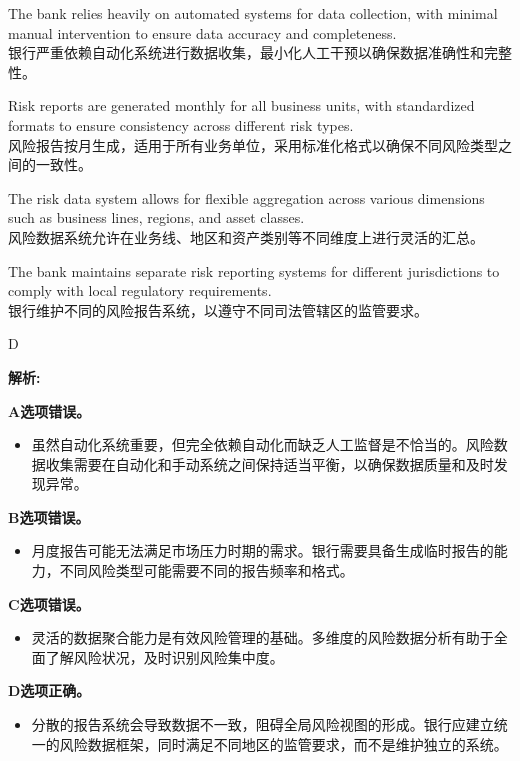 \documentclass{article}
\newenvironment{explanation}
{\textbf{解析:}\par}
{\par}
\begin{document}
\begin{choices}
    \item The bank relies heavily on automated systems for data collection, with minimal manual intervention to ensure data accuracy and completeness. \\
    银行严重依赖自动化系统进行数据收集，最小化人工干预以确保数据准确性和完整性。

    \item Risk reports are generated monthly for all business units, with standardized formats to ensure consistency across different risk types. \\
    风险报告按月生成，适用于所有业务单位，采用标准化格式以确保不同风险类型之间的一致性。

    \item The risk data system allows for flexible aggregation across various dimensions such as business lines, regions, and asset classes. \\
    风险数据系统允许在业务线、地区和资产类别等不同维度上进行灵活的汇总。

    \item The bank maintains separate risk reporting systems for different jurisdictions to comply with local regulatory requirements. \\
    银行维护不同的风险报告系统，以遵守不同司法管辖区的监管要求。
\end{choices}

\begin{correctanswer}
    D
\end{correctanswer}

\begin{explanation}
    \textbf{A选项错误。}
    \begin{itemize}
        \item 虽然自动化系统重要，但完全依赖自动化而缺乏人工监督是不恰当的。风险数据收集需要在自动化和手动系统之间保持适当平衡，以确保数据质量和及时发现异常。
    \end{itemize}
    
    \textbf{B选项错误。}
    \begin{itemize}
        \item 月度报告可能无法满足市场压力时期的需求。银行需要具备生成临时报告的能力，不同风险类型可能需要不同的报告频率和格式。
    \end{itemize}
    
    \textbf{C选项错误。}
    \begin{itemize}
        \item 灵活的数据聚合能力是有效风险管理的基础。多维度的风险数据分析有助于全面了解风险状况，及时识别风险集中度。
    \end{itemize}
    
    \textbf{D选项正确。}
    \begin{itemize}
        \item 分散的报告系统会导致数据不一致，阻碍全局风险视图的形成。银行应建立统一的风险数据框架，同时满足不同地区的监管要求，而不是维护独立的系统。
    \end{itemize}
\end{explanation}
\end{document}
